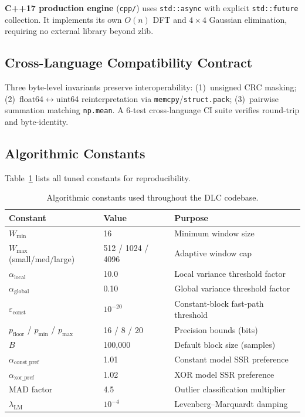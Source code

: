 \documentclass[runningheads]{llncs}
\begin{document}
\textbf{C++17 production engine} (\texttt{cpp/}) uses \texttt{std::async} with explicit \texttt{std::future} collection. It implements its own $O(n)$ DFT and $4\times 4$ Gaussian elimination, requiring no external library beyond zlib.

\subsection{Cross-Language Compatibility Contract}

Three byte-level invariants preserve interoperability: (1)~unsigned CRC masking; (2)~float64$\leftrightarrow$uint64 reinterpretation via \texttt{memcpy}/\texttt{struct.pack}; (3)~pairwise summation matching \texttt{np.mean}. A 6-test cross-language CI suite verifies round-trip and byte-identity.

\subsection{Algorithmic Constants}

Table~\ref{tab:constants} lists all tuned constants for reproducibility.

\begin{table}[t]
\centering
\caption{Algorithmic constants used throughout the DLC codebase.}
\label{tab:constants}
\small
\begin{tabular}{llp{5cm}}
\toprule
\textbf{Constant} & \textbf{Value} & \textbf{Purpose} \\
\midrule
$W_{\min}$ & 16 & Minimum window size \\
$W_{\max}$ (small/med/large) & 512 / 1024 / 4096 & Adaptive window cap \\
$\alpha_{\text{local}}$ & 10.0 & Local variance threshold factor \\
$\alpha_{\text{global}}$ & 0.10 & Global variance threshold factor \\
$\varepsilon_{\text{const}}$ & $10^{-20}$ & Constant-block fast-path threshold \\
$p_{\text{floor}}$ / $p_{\min}$ / $p_{\max}$ & 16 / 8 / 20 & Precision bounds (bits) \\
$B$ & 100,000 & Default block size (samples) \\
$\alpha_{\text{const\_pref}}$ & 1.01 & Constant model SSR preference \\
$\alpha_{\text{xor\_pref}}$ & 1.02 & XOR model SSR preference \\
MAD factor & 4.5 & Outlier classification multiplier \\
$\lambda_{\text{LM}}$ & $10^{-4}$ & Levenberg--Marquardt damping \\
\bottomrule
\end{tabular}
\end{table}
\end{document}
